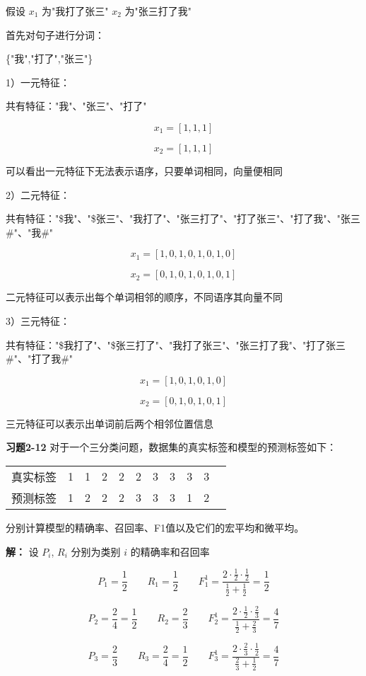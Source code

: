 假设 $x_1$ 为"我打了张三" $x_2$ 为"张三打了我"

首先对句子进行分词：

\{"我","打了","张三"\}

1）一元特征：

共有特征："我"、"张三"、"打了"

\[
x_1 = [1,1,1]
\]

\[
x_2 = [1,1,1]
\]

可以看出一元特征下无法表示语序，只要单词相同，向量便相同

2）二元特征：

共有特征："\$我"、"\$张三"、"我打了"、"张三打了"、"打了张三"、"打了我"、"张三\#"、"我\#"

\[
x_1 = [1,0,1,0,1,0,1,0]
\]

\[
x_2 = [0,1,0,1,0,1,0,1]
\]

二元特征可以表示出每个单词相邻的顺序，不同语序其向量不同

3）三元特征：

共有特征："\$我打了"、"\$张三打了"、"我打了张三"、"张三打了我"、"打了张三\#"、"打了我\#"

\[
x_1 = [1,0,1,0,1,0]
\]

\[
x_2 = [0,1,0,1,0,1]
\]

三元特征可以表示出单词前后两个相邻位置信息

\noindent\textbf{习题2-12} 对于一个三分类问题，数据集的真实标签和模型的预测标签如下：

\begin{tabular}{ccccccccccc}
\hline
真实标签 & 1 & 1 & 2 & 2 & 2 & 3 & 3 & 3 & 3 \\
预测标签 & 1 & 2 & 2 & 2 & 3 & 3 & 3 & 1 & 2 \\
\hline
\end{tabular}

分别计算模型的精确率、召回率、F1值以及它们的宏平均和微平均。

\textbf{解：} 设 $P_i$, $R_i$ 分别为类别 $i$ 的精确率和召回率

\[P_1 = \frac{1}{2} \qquad R_1 = \frac{1}{2} \qquad F_1^1 = \frac{2\cdot\frac{1}{2}\cdot\frac{1}{2}}{\frac{1}{2}+\frac{1}{2}} = \frac{1}{2}\]

\[P_2 = \frac{2}{4} = \frac{1}{2} \qquad R_2 = \frac{2}{3} \qquad F_2^1 = \frac{2\cdot\frac{1}{2}\cdot\frac{2}{3}}{\frac{1}{2}+\frac{2}{3}} = \frac{4}{7}\]

\[P_3 = \frac{2}{3} \qquad R_3 = \frac{2}{4} = \frac{1}{2} \qquad F_3^1 = \frac{2\cdot\frac{2}{3}\cdot\frac{1}{2}}{\frac{2}{3}+\frac{1}{2}} = \frac{4}{7}\]

